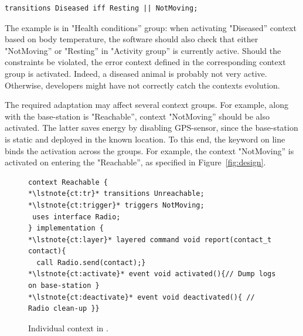 \vspace{-1mm}
\begin{lstlisting}[language=conesc]
transitions Diseased iff Resting || NotMoving;
\end{lstlisting}
\vspace{-1.5mm}

The example is in "Health conditions'' group: when activating "Diseased''
context based on body temperature, the software should also check that either
"NotMoving'' or "Resting'' in "Activity group'' is currently active. Should the
constraints be violated, the error context defined in the corresponding context
group is activated. Indeed, a diseased animal is probably not very active.
Otherwise, developers might have not correctly catch the contexts
evolution.

The required adaptation may affect several context groups. For example, along
with the base-station is "Reachable'', context "NotMoving'' should be also
activated. The latter saves energy by disabling GPS-sensor, since the
base-station is static and deployed in the known location. To this end,
the keyword  on line~ binds the activation
across the groups. For example, the context "NotMoving'' is activated on
entering the "Reachable'', as specified in Figure~\ref{fig:design}.


\begin{figure}[!tb]
\begin{lstlisting}[style=conescframe]
context Reachable {
*\lstnote{ct:tr}* transitions Unreachable;
*\lstnote{ct:trigger}* triggers NotMoving;
 uses interface Radio;
} implementation {
*\lstnote{ct:layer}* layered command void report(contact_t contact){
  call Radio.send(contact);}
*\lstnote{ct:activate}* event void activated(){// Dump logs on base-station }
*\lstnote{ct:deactivate}* event void deactivated(){ // Radio clean-up }}
\end{lstlisting}
\caption{Individual context in \conesc.}
  \label{fig:context}
\vspace{-5mm}
\end{figure}
